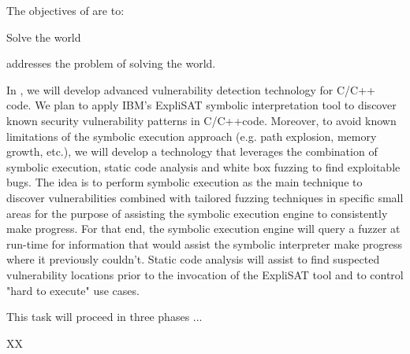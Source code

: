 \addtocounter{wpno}{1}
\begin{Workpackage}{\thewpno}
\WPTitle{\wpname{\thewpno}}

\begin{WPObjectives}
The objectives of \theWP{} are to:
\begin{compactitem}
\item Solve the world
\end{compactitem}
\end{WPObjectives}

\begin{WPDescription}
\theWP{} addresses the problem of solving the world.
\end{WPDescription}

\begin{Task}

\TaskResults{%
}
\TaskHeader{}

In \theTask, we will develop advanced vulnerability detection technology for C/C++ code. We plan to apply IBM's ExpliSAT symbolic interpretation tool to discover known security vulnerability patterns in C/C++code. Moreover, to avoid known limitations of the symbolic execution approach (e.g. path explosion, memory growth, etc.), we will develop a technology that leverages the combination of symbolic execution, static code analysis and white box fuzzing to find exploitable bugs. The idea is to perform symbolic execution as the main technique to discover vulnerabilities combined with tailored fuzzing techniques in specific small areas for the purpose of assisting the symbolic execution engine to consistently make progress. For that end, the symbolic execution engine will query a fuzzer at run-time for information that would assist the symbolic interpreter make progress where it previously couldn't. Static code analysis will assist to find suspected vulnerability locations prior to the invocation of the ExpliSAT tool and to control "hard to execute" use cases.

This task will proceed in three phases ...

\end{Task}



\begin{WPDeliverables}
  \begin{compactitem}
    \item XX
\end{compactitem}
\end{WPDeliverables}
\end{Workpackage}
